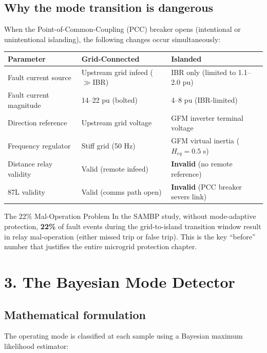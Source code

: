 \documentclass[12pt,a4paper]{article}
\begin{document}
\subsection{Why the mode transition is dangerous}

When the Point-of-Common-Coupling (PCC) breaker opens (intentional or unintentional
islanding), the following changes occur simultaneously:

\begin{tabular}{@{}lp{5.5cm}p{5.5cm}@{}}
\toprule
\textbf{Parameter} & \textbf{Grid-Connected} & \textbf{Islanded}\\
\midrule
Fault current source & Upstream grid infeed ($\gg$IBR) & IBR only (limited to 1.1--2.0 pu)\\
Fault current magnitude & 14--22 pu (bolted) & 4--8 pu (IBR-limited)\\
Direction reference & Upstream grid voltage & GFM inverter terminal voltage\\
Frequency regulator & Stiff grid (50 Hz) & GFM virtual inertia ($H_{eq}=0.5$ s)\\
Distance relay validity & Valid (remote infeed) & \textbf{Invalid} (no remote reference)\\
87L validity & Valid (comms path open) & \textbf{Invalid} (PCC breaker severs link)\\
\bottomrule
\end{tabular}

\vspace{0.5em}
\begin{warnbox}{The 22\% Mal-Operation Problem}
In the SAMBP study, without mode-adaptive protection, \textbf{22\%} of fault events
during the grid-to-island transition window result in relay mal-operation (either
missed trip or false trip). This is the key ``before'' number that justifies the
entire microgrid protection chapter.
\end{warnbox}

\section{3.\; The Bayesian Mode Detector}

\subsection{Mathematical formulation}

The operating mode is classified at each sample using a Bayesian maximum likelihood
estimator:
\end{document}
